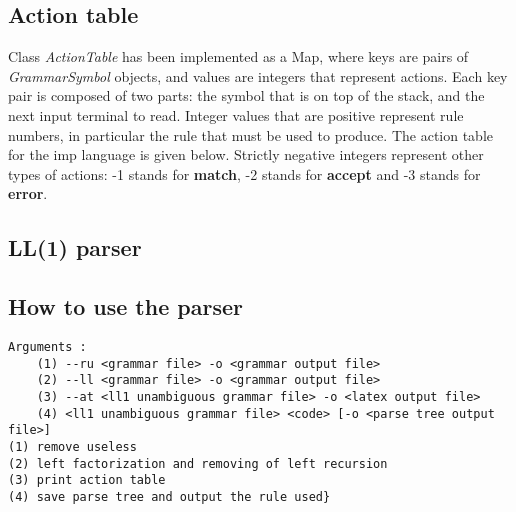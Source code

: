 \subsection{Action table}

Class \textit{ActionTable} has been implemented as a Map, where keys are pairs of \textit{GrammarSymbol} objects, and values are integers
that represent actions. Each key pair is composed of two parts: the symbol that is on top of the stack, and the next input terminal to read.
Integer values that are positive represent rule numbers, in particular the rule that must be used to produce. The
action table for the imp language is given below. Strictly negative integers
represent other types of actions: -1 stands for \textbf{match}, -2 stands for \textbf{accept} and -3 stands for \textbf{error}.


\subsection{LL(1) parser}

\subsection{How to use the parser}

\begin{lstlisting}
Arguments :
	(1) --ru <grammar file> -o <grammar output file>
	(2) --ll <grammar file> -o <grammar output file>
	(3) --at <ll1 unambiguous grammar file> -o <latex output file>
	(4) <ll1 unambiguous grammar file> <code> [-o <parse tree output file>]
(1) remove useless
(2) left factorization and removing of left recursion
(3) print action table
(4) save parse tree and output the rule used}
\end{lstlisting}

